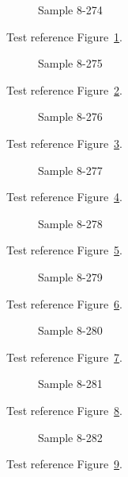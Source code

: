 \begin{figure}[tbhp]
\caption{Sample 8-274}
\label{fig:sample-8-274}
\end{figure}

Test reference Figure~\ref{fig:sample-8-274}.

\begin{figure}[tbhp]
\caption{Sample 8-275}
\label{fig:sample-8-275}
\end{figure}

Test reference Figure~\ref{fig:sample-8-275}.

\begin{figure}[tbhp]
\caption{Sample 8-276}
\label{fig:sample-8-276}
\end{figure}

Test reference Figure~\ref{fig:sample-8-276}.

\begin{figure}[tbhp]
\caption{Sample 8-277}
\label{fig:sample-8-277}
\end{figure}

Test reference Figure~\ref{fig:sample-8-277}.

\begin{figure}[tbhp]
\caption{Sample 8-278}
\label{fig:sample-8-278}
\end{figure}

Test reference Figure~\ref{fig:sample-8-278}.

\begin{figure}[tbhp]
\caption{Sample 8-279}
\label{fig:sample-8-279}
\end{figure}

Test reference Figure~\ref{fig:sample-8-279}.

\begin{figure}[tbhp]
\caption{Sample 8-280}
\label{fig:sample-8-280}
\end{figure}

Test reference Figure~\ref{fig:sample-8-280}.

\begin{figure}[tbhp]
\caption{Sample 8-281}
\label{fig:sample-8-281}
\end{figure}

Test reference Figure~\ref{fig:sample-8-281}.

\begin{figure}[tbhp]
\caption{Sample 8-282}
\label{fig:sample-8-282}
\end{figure}

Test reference Figure~\ref{fig:sample-8-282}.

